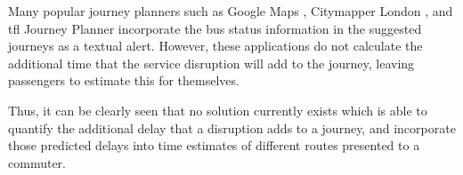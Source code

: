 \par Many popular journey planners such as Google Maps \cite{google_maps}, Citymapper London \cite{citymapper}, and \acrshort{tfl} Journey Planner incorporate the bus status information in the suggested journeys as a textual alert. However, these applications do not calculate the additional time that the service disruption will add to the journey, leaving passengers to estimate this for themselves.

\par Thus, it can be clearly seen that no solution currently exists which is able to quantify the additional delay that a disruption adds to a journey, and incorporate those predicted delays into time estimates of different routes presented to a commuter.

